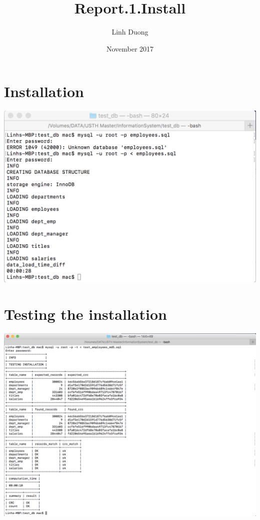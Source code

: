 \documentclass{article}
\title{Report.1.Install}
\author{Linh Duong}
\date{November 2017}
\begin{document}
\maketitle

\section{Installation}

\includegraphics[width=\linewidth]{out1.png}

\newpage

\section{Testing the installation}

\includegraphics[width=\linewidth]{out2.png}
\end{document}
